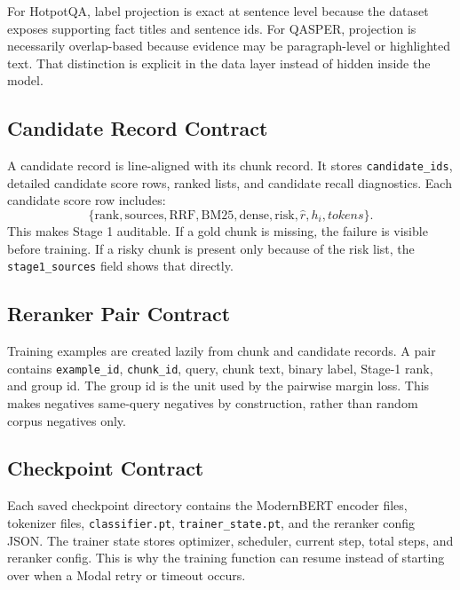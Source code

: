 \documentclass[10pt,twocolumn]{article}
\begin{document}
For HotpotQA, label projection is exact at sentence level because the dataset exposes supporting fact titles and sentence ids. For QASPER, projection is necessarily overlap-based because evidence may be paragraph-level or highlighted text. That distinction is explicit in the data layer instead of hidden inside the model.

\subsection{Candidate Record Contract}
A candidate record is line-aligned with its chunk record. It stores \texttt{candidate\_ids}, detailed candidate score rows, ranked lists, and candidate recall diagnostics. Each candidate score row includes:
\[
\{\mathrm{rank},\mathrm{sources},\mathrm{RRF},\mathrm{BM25},\mathrm{dense},\mathrm{risk},\hat r,h_i,tokens\}.
\]
This makes Stage 1 auditable. If a gold chunk is missing, the failure is visible before training. If a risky chunk is present only because of the risk list, the \texttt{stage1\_sources} field shows that directly.

\subsection{Reranker Pair Contract}
Training examples are created lazily from chunk and candidate records. A pair contains \texttt{example\_id}, \texttt{chunk\_id}, query, chunk text, binary label, Stage-1 rank, and group id. The group id is the unit used by the pairwise margin loss. This makes negatives same-query negatives by construction, rather than random corpus negatives only.

\subsection{Checkpoint Contract}
Each saved checkpoint directory contains the ModernBERT encoder files, tokenizer files, \texttt{classifier.pt}, \texttt{trainer\_state.pt}, and the reranker config JSON. The trainer state stores optimizer, scheduler, current step, total steps, and reranker config. This is why the training function can resume instead of starting over when a Modal retry or timeout occurs.
\end{document}
